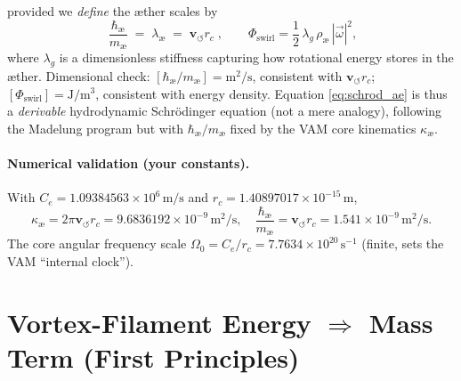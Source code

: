 \documentclass[a4paper,12pt]{article}
\begin{document}
    provided we \emph{define} the æther scales by
    \begin{equation}
        \boxed{\;\frac{\hbar_\text{\ae}}{m_\text{\ae}} \;=\; \lambda_\text{\ae} \;=\; \mathbf{v}_{\scriptscriptstyle\boldsymbol{\circlearrowleft}} r_c\;}\!,
        \qquad
        \Phi_\text{swirl}=\frac{1}{2}\,\lambda_g\,\rho_\text{\ae}\,|\vec\omega|^2,
    \end{equation}
    where $\lambda_g$ is a dimensionless stiffness capturing how rotational energy stores in the æther. Dimensional check: $[\hbar_\text{\ae}/m_\text{\ae}]=\text{m}^2/\text{s}$, consistent with $\mathbf{v}_{\scriptscriptstyle\boldsymbol{\circlearrowleft}} r_c$; $[\Phi_\text{swirl}]=\text{J}/\text{m}^3$, consistent with energy density. Equation \eqref{eq:schrod_ae} is thus a \emph{derivable} hydrodynamic Schrödinger equation (not a mere analogy), following the Madelung program but with $\hbar_\text{\ae}/m_\text{\ae}$ fixed by the VAM core kinematics $\kappa_\text{\ae}$.

    \paragraph{Numerical validation (your constants).}
    With $C_e=1.09384563\times10^6\,\text{m/s}$ and $r_c=1.40897017\times10^{-15}\,\text{m}$,
    \[
        \kappa_\text{\ae}=2\pi \mathbf{v}_{\scriptscriptstyle\boldsymbol{\circlearrowleft}} r_c=9.6836192\times 10^{-9}\,\text{m}^2/\text{s},\quad
        \frac{\hbar_\text{\ae}}{m_\text{\ae}}=\mathbf{v}_{\scriptscriptstyle\boldsymbol{\circlearrowleft}} r_c=1.541\times 10^{-9}\,\text{m}^2/\text{s}.
    \]
    The core angular frequency scale $\Omega_0=C_e/r_c=7.7634\times 10^{20}\,\text{s}^{-1}$ (finite, sets the VAM ``internal clock'').

    \medskip

    \section{Vortex-Filament Energy $\Rightarrow$ Mass Term (First Principles)}
    \label{sec:mass_from_energy}
\end{document}
